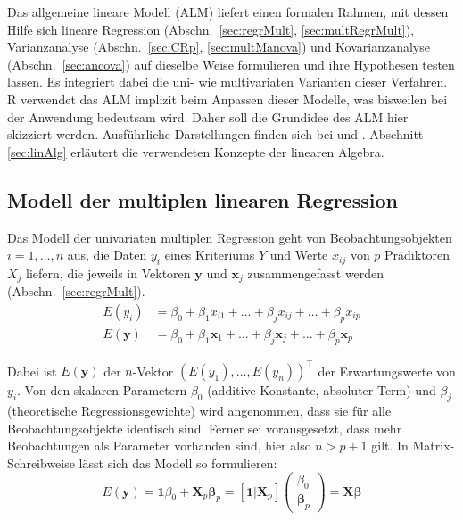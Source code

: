 Das allgemeine lineare Modell (ALM) liefert einen formalen Rahmen, mit dessen Hilfe sich lineare Regression (Abschn.\ \ref{sec:regrMult}, \ref{sec:multRegrMult}), Varianzanalyse (Abschn.\ \ref{sec:CRp}, \ref{sec:multManova}) und Kovarianzanalyse (Abschn.\ \ref{sec:ancova}) auf dieselbe Weise formulieren und ihre Hypothesen testen lassen. Es integriert dabei die uni- wie multivariaten Varianten dieser Verfahren. R verwendet das ALM implizit beim Anpassen dieser Modelle, was bisweilen bei der Anwendung bedeutsam wird. Daher soll die Grundidee des ALM hier skizziert werden. Ausführliche Darstellungen finden sich bei  und . Abschnitt \ref{sec:linAlg} erläutert die verwendeten Konzepte der linearen Algebra.

\subsection{Modell der multiplen linearen Regression}
\label{sec:multALMregr}

Das Modell der univariaten multiplen Regression geht von Beobachtungsobjekten $i = 1, \ldots, n$ aus, die Daten $y_{i}$ eines Kriteriums $Y$ und Werte $x_{ij}$ von $p$ Prädiktoren $X_{j}$ liefern, die jeweils in Vektoren $\bm{y}$ und $\bm{x}_{j}$ zusammengefasst werden (Abschn.\ \ref{sec:regrMult}).
\begin{align*}
E(y_{i})  &= \beta_{0} + \beta_{1} x_{i1} + \dots + \beta_{j} x_{ij} + \dots + \beta_{p} x_{ip}\\
E(\bm{y}) &= \beta_{0} + \beta_{1} \bm{x}_{1} + \dots + \beta_{j} \bm{x}_{j} + \dots + \beta_{p} \bm{x}_{p}
\end{align*}

Dabei ist $E(\bm{y})$ der $n$-Vektor $(E(y_{1}), \ldots, E(y_{n}))^{\top}$ der Erwartungswerte von $y_{i}$. Von den skalaren Parametern $\beta_{0}$ (additive Konstante, absoluter Term) und $\beta_{j}$ (theoretische Regressionsgewichte) wird angenommen, dass sie für alle Beobachtungsobjekte identisch sind. Ferner sei vorausgesetzt, dass mehr Beobachtungen als Parameter vorhanden sind, hier also $n > p + 1$ gilt. In Matrix-Schreibweise lässt sich das Modell so formulieren:
\begin{equation*}
E(\bm{y}) = \bm{1} \beta_{0} + \bm{X}_{p} \bm{\beta}_{p} =
[\bm{1}|\bm{X}_{p}] \left(\begin{array}{c} \beta_{0} \\ \bm{\beta}_{p} \end{array}\right) =
\bm{X} \bm{\beta}
\end{equation*}

